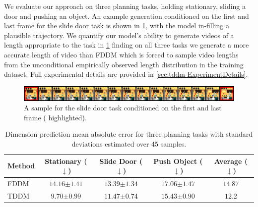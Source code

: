 We evaluate our approach on three planning tasks, holding stationary, sliding a door and pushing an object. An example generation conditioned on the first and last frame for the slide door task is shown in \cref{fig:tddm-video_example}, with the model in-filling a plausible trajectory. We quantify our model's ability to generate videos of a length appropriate to the task in \cref{tab:video_results} finding on all three tasks we generate a more accurate length of video than FDDM which is forced to sample video lengths from the unconditional empirically observed length distribution in the training dataset. Full experimental details are provided in \cref{sec:tddm-ExperimentDetails}.


\begin{figure}[t]
    \centering
    \includegraphics[width=\textwidth]{figs/tddm/21-1-padded_red_big.png}
    \caption{A sample for the slide door task conditioned on the first and last frame ({\color{red} highlighted}).}
    \label{fig:tddm-video_example}
\end{figure}

\begin{table}[t]
     \centering
   \caption{Dimension prediction mean absolute error for three planning tasks with standard deviations estimated over 45 samples.}
   \begin{tabular}{@{}lcccc@{}}
     \toprule
     Method & Stationary ($\downarrow$) & Slide Door ($\downarrow$) & Push Object ($\downarrow$) & Average ($\downarrow$)   \\ \midrule
     FDDM & $14.16 {\scriptstyle \pm 1.41}$ & $13.39 {\scriptstyle \pm 1.34}$ & $17.06 {\scriptstyle \pm 1.47}$ & $14.87$ \\
     TDDM & $\mathbf{9.70 {\scriptstyle \pm 0.99}}$ & $\mathbf{11.47 {\scriptstyle \pm 0.74}}$ & $\mathbf{15.43 {\scriptstyle \pm 0.90}}$ & $\mathbf{12.2}$ \\ \bottomrule
   \end{tabular}
   \label{tab:video_results}
\end{table}


